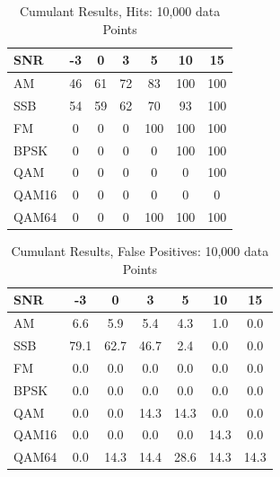  
\begin{table}
\caption{Cumulant Results, Hits: 10,000 data Points}
\centering
\begin{tabular}{ l | c | c | c | c | c | c } \hline
SNR   &	 -3 &	 0 &	 3 &	 5 &	 10 &	 15\\ \hline \hline 
AM    &	 46 &	 61 &	 72 &	 83 &	 100 &	 100 \\ \hline 
SSB   &	 54 &	 59 &	 62 &	 70 &	 93 &	 100 \\ \hline 
FM    &	 0 &	 0 &	 0 &	 100 &	 100 &	 100 \\ \hline 
BPSK  &	 0 &	 0 &	 0 &	 0 &	 100 &	 100 \\ \hline 
QAM   &	 0 &	 0 &	 0 &	 0 &	 0 &	 100 \\ \hline 
QAM16 &	 0 &	 0 &	 0 &	 0 &	 0 &	 0 \\ \hline 
QAM64 &	 0 &	 0 &	 0 &	 100 &	 100 &	 100 \\ \hline 
\end{tabular}
\label{tab:cumHit10000pt}
\end{table}

\begin{table}
\caption{Cumulant Results, False Positives: 10,000 data Points}
\centering
\begin{tabular}{ l | c | c | c | c | c | c } \hline
SNR   &	 -3 &	 0 &	 3 &	 5 &	 10 &	 15\\ \hline \hline 
AM &	 6.6 &	 5.9 &	 5.4 &	 4.3 &	 1.0 &	 0.0 \\ \hline 
SSB &	 79.1 &	 62.7 &	 46.7 &	 2.4 &	 0.0 &	 0.0 \\ \hline 
FM &	 0.0 &	 0.0 &	 0.0 &	 0.0 &	 0.0 &	 0.0  \\ \hline 
BPSK &	 0.0 &	 0.0 &	 0.0 &	 0.0 &	 0.0 &	 0.0 \\ \hline 
QAM &	 0.0 &	 0.0 &	 14.3 &	 14.3 &	 0.0 &	 0.0 \\ \hline 
QAM16 &	 0.0 &	 0.0 &	 0.0 &	 0.0 &	 14.3 &	 0.0 \\ \hline 
QAM64 &	 0.0 &	 14.3 &	 14.4 &	 28.6 &	 14.3 &	 14.3 \\ \hline 
\end{tabular}
\label{tab:cumFalsePositive10000pt}
\end{table}

